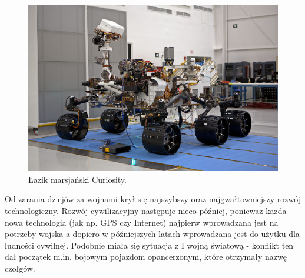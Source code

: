   \begin{figure}[H]
    \begin{center}
      \includegraphics[scale=0.8]{imgs/curiosity.png}
 \caption[Łazik marsjański \textit{Curiosity}]{\small{Łazik marsjański Curiosity.}\footnotemark}
        \label{lazik}
    \end{center}
  \end{figure}

Od zarania dziejów za wojnami krył się najszybszy oraz najgwałtowniejszy rozwój technologiczny. Rozwój cywilizacyjny następuje nieco później, ponieważ każda nowa technologia (jak np. GPS czy Internet) najpierw wprowadzana jest na potrzeby wojska a dopiero w późniejszych latach wprowadzana jest do użytku dla ludności cywilnej. Podobnie miała się sytuacja z I wojną światową - konflikt ten dał początek m.in. bojowym pojazdom opancerzonym, które otrzymały nazwę czołgów.

